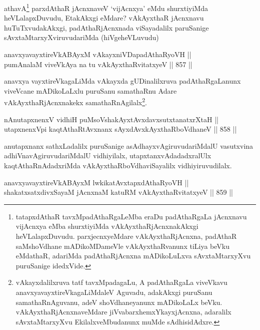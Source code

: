 \begin{artha}
athavA\footnote{tatapxdAthaR tavxMpadAthaRgaLeMba eraDu padAthaRgaLa jAcnxnavu vijAcnxya eMba shurxtiyiMda vAkAyxthaRjAcnxnakAkxgi heVLalapxDuvudu. parxjecnxyeMdare vAkAyxthaRjAcnxna, padAthaR saMshoVdhane mADikoMDameVle vAkAyxthaRvanunx tiLiya beVku eMdathaR, adariMda padAthaRjAcnxna mADikoLuLxva sAvxtaMtarxyXvu puruSanige idedxVide.} parxdAthaR jAcnxnaveV `vijAcnxya' eMdu shurxtiyiMda heVLalapxDuvudu, EtakAkxgi eMdare? vAkAyxthaR jAcnxnavu huTuTxvudakAkxgi, padAthaRjAcnxnada viSayadalilx paruSanige sAvxtaMtarxyXviruvudariMda (hiVgeheVLuvudu)
\end{artha}


\begin{shl}
anavxyavayxtireVkABAyxM vAkayxniVDapadAthaRyoVH || \\
pumAnalaM viveVkAya na tu vAkAyxthaRvitatxyeV \hfill || 857 ||  
\end{shl}

\begin{artha}
anavxya vayxtireVkagaLiMda vAkayxda gUDinalilxruva padAthaRgaLanunx viveVcane mADikoLaLxlu puruSanu samathaRnu Adare vAkAyxthaRjAcnxnakekx samathaRnAgilalx\footnote{vAkayxdalilxruva tatf tavxMpadagaLu, A padAthaRgaLa viveVkavu anavxyavayxtireVkagaLiMdaleV Aguvadu, adakAkxgi puruSanu samathaRnAguvanu, adeV shoVdhaneyanunx mADikoLaLx beVku. vAkAyxthaRjAcnxnaveMdare jiVvabarxhemxYkayxjAcnxna, adaralilx sAvxtaMtarxyXvu EkilalxveMbudanunx muMde sAdhisidAdxre.}.
\end{artha}

\begin{shl}
nAnutapxnenxV vidhiH puMsoV\s shakAyxtAvxdavxsutxtanatxrXtaH || \\
utapxnenxV\s pi kaqtAthaRtAvxnanx sAyxdAvxkAyxthaRboVdhaneV \hfill || 858 ||  
\end{shl}

\begin{artha}
anutapxnanx sathxLadalilx puruSanige asAdhayxvAgiruvudariMdalU vasutxvina adhiVnavAgiruvudariMdalU vidhiyilalx, utapxtanxvAdadadxralUlx kaqtAthaRnAdadxriMda vAkAyxthaRboVdhaviSayalilx vidhiyiruvudilalx.
\end{artha}

\begin{shl}
anavxyavayxtireVkABAyxM lwkikatAvxtapxdAthaRyoVH || \\
shakatxsatxdivxSayaM jAcnxnaM katuRM vAkAyxthaRvitatxyeV \hfill || 859 ||  
\end{shl}

